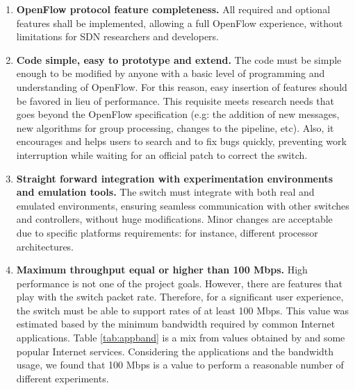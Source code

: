 \begin{enumerate}

\item  \textbf{OpenFlow protocol feature completeness.} All required and optional features shall be implemented, allowing a full OpenFlow experience, without limitations for SDN researchers and developers.   

\item  \textbf{Code simple, easy to prototype and extend.} The code must be simple enough to be modified by anyone with a basic level of programming and understanding of OpenFlow. For this reason, easy insertion of features should be favored in lieu of performance. This requisite meets research needs that goes beyond the OpenFlow specification (e.g: the addition of new messages, new algorithms for group processing, changes to the pipeline, etc). Also, it encourages and helps users to search and to fix bugs quickly, preventing work interruption while waiting for an official patch to correct the switch.       

\item  \textbf{Straight forward integration with experimentation environments and emulation tools.} The switch must integrate with both real and emulated environments, ensuring seamless communication with other switches and controllers, without huge modifications. Minor changes are acceptable due to specific platforms requirements: for instance, different processor architectures.

\item \textbf{Maximum throughput equal or higher than 100 Mbps.} High performance is not one of the project goals. However, there are features that play with the switch packet rate. Therefore, for a significant user experience, the switch must be able to support rates of at least 100 Mbps. This value was estimated based by the minimum bandwidth required by common Internet applications. Table \ref{tab:appband} is a mix from values obtained by \cite{Chen:2004:QRN:1234242.1234243} and some popular Internet services. Considering the applications and the bandwidth usage, we found that 100 Mbps is a value to perform a reasonable number of different experiments.          


\end{enumerate}
